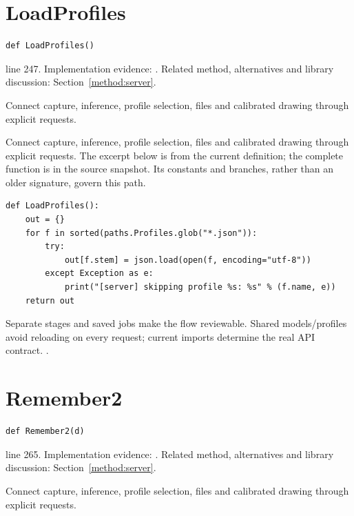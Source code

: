 \section{LoadProfiles}\label{fn:web-server:LoadProfiles}
\begin{lstlisting}[style=sig]
def LoadProfiles()
\end{lstlisting}
 line 247. Implementation evidence: \cite{code2026}. Related method, alternatives and library discussion: Section~\ref{method:server}.


Connect capture, inference, profile selection, files and calibrated drawing through explicit requests.


Connect capture, inference, profile selection, files and calibrated drawing through explicit requests. The excerpt below is from the current definition; the complete function is in the source snapshot. Its constants and branches, rather than an older signature, govern this path.


\begin{lstlisting}[style=plain]
def LoadProfiles():
    out = {}
    for f in sorted(paths.Profiles.glob("*.json")):
        try:
            out[f.stem] = json.load(open(f, encoding="utf-8"))
        except Exception as e:
            print("[server] skipping profile %s: %s" % (f.name, e))
    return out
\end{lstlisting}
Separate stages and saved jobs make the flow reviewable. Shared models/profiles avoid reloading on every request; current imports determine the real API contract. \cite{flaskdocs,pillowops,code2026}.


\section{Remember2}\label{fn:web-server:Remember2}
\begin{lstlisting}[style=sig]
def Remember2(d)
\end{lstlisting}
 line 265. Implementation evidence: \cite{code2026}. Related method, alternatives and library discussion: Section~\ref{method:server}.


Connect capture, inference, profile selection, files and calibrated drawing through explicit requests.


